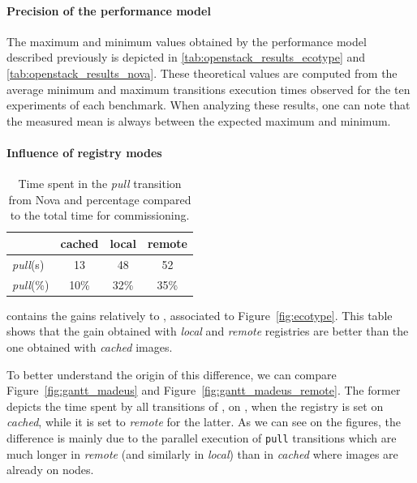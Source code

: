 \paragraph{Precision of the performance model}
The maximum and minimum values obtained by the performance model
described previously is depicted in
\cref{tab:openstack_results_ecotype} and \cref{tab:openstack_results_nova}. These theoretical values are computed
from the average minimum and maximum transitions execution times
observed for the ten experiments of each benchmark. When analyzing
these results, one can note that the measured mean is always
between the expected maximum and minimum.


\paragraph{Influence of registry modes}

\begin{table}
  \begin{center}
    \begin{tabular}{lccc}
      \toprule
      & cached & local & remote\\
      \midrule
      \emph{pull}(s) & 13 & 48 & 52\\
      \emph{pull}(\%) & 10\% & 32\% & 35\%\\
      \bottomrule
    \end{tabular}
    \caption{Time spent in the \emph{pull} transition from Nova and
    percentage compared to the total time for \madass commissioning.}
    \label{tab:pull}
  \end{center}
\end{table}
 contains the gains relatively to \ansass,
associated to Figure~\ref{fig:ecotype}. This table shows that the gain
obtained with \emph{local} and \emph{remote} registries are better
than the one obtained with \emph{cached} \docker images.

To better understand the origin of this difference, we can compare
Figure~\ref{fig:gantt_madeus} and
Figure~\ref{fig:gantt_madeus_remote}. The former depicts the time
spent by all transitions of \madass, on \ecotype, when the \docker
registry is set on \emph{cached}, while it is set to \emph{remote} for
the latter. As we can see on the figures, the difference is mainly due
to the parallel execution of \texttt{pull} transitions which are much
longer in \emph{remote} (and similarly in \emph{local}) than in
\emph{cached} where images are already on nodes.

